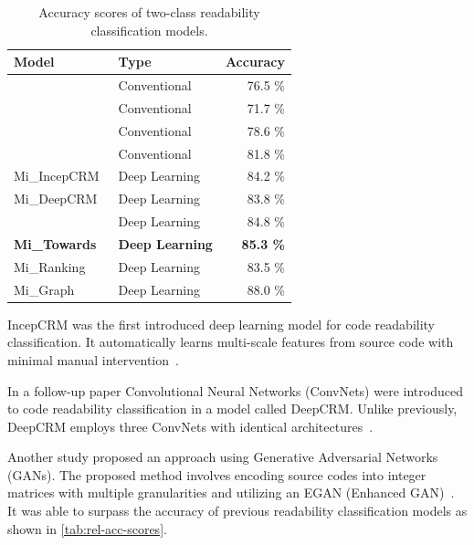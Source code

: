 \documentclass[%
class=scrreprt,
chapterprefix=false,%
open=right,%
twoside=true,%
paper=a4,%
logofile={Logo\_zentral\_farbig\_EN.png},%
thesistype=master,%
UKenglish,%
]{se2thesis}
\theoremstyle{definition}
\begin{document}
	\begin{table}[tb]
		\centering
		\caption{Accuracy scores of two-class readability classification models.}
		\label{tab:rel-acc-scores}
		\begin{tabular}{llr}
			\toprule
			Model & Type & Accuracy \\
			\midrule
			\citeauthor{buse2009learning}~\cite{buse2009learning} & Conventional & 76.5 \% \\
			\citeauthor{posnett2011simpler}~\cite{posnett2011simpler} & Conventional & 71.7 \% \\
			\citeauthor{dorn2012general}~\cite{dorn2012general} & Conventional & 78.6 \% \\
			\citeauthor{scalabrino2018comprehensive}~\cite{scalabrino2018comprehensive} & Conventional & 81.8 \% \\
			Mi\_IncepCRM~\cite{mi2018inception} & Deep Learning & 84.2 \% \\
			Mi\_DeepCRM~\cite{mi2018improving} & Deep Learning & 83.8 \% \\
			\citeauthor{sharma2020egan}~\cite{sharma2020egan} & Deep Learning & 84.8 \% \\
			\textbf{Mi\_Towards~\cite{mi2022towards}} & \textbf{Deep Learning} & \textbf{85.3 \%} \\
			Mi\_Ranking~\cite{mi2022rank} & Deep Learning & 83.5 \% \\
			Mi\_Graph~\cite{mi2023graph} & Deep Learning & 88.0 \% \\
			\bottomrule
		\end{tabular}
	\end{table}
	
	IncepCRM was the first introduced deep learning model for code readability classification. It automatically learns multi-scale features from source code with minimal manual intervention~\cite{mi2018inception}.
	
	In a follow-up paper Convolutional Neural Networks (ConvNets) were introduced to code readability classification in a model called DeepCRM. Unlike previously, DeepCRM employs three ConvNets with identical architectures~\cite{mi2018improving}.
		
	Another study proposed an approach using Generative Adversarial Networks (GANs). The proposed method involves encoding source codes into integer matrices with multiple granularities and utilizing an EGAN (Enhanced GAN)~\cite{sharma2020egan}. It was able to surpass the accuracy of previous readability classification models as shown in \autoref{tab:rel-acc-scores}.
	
\end{document}
